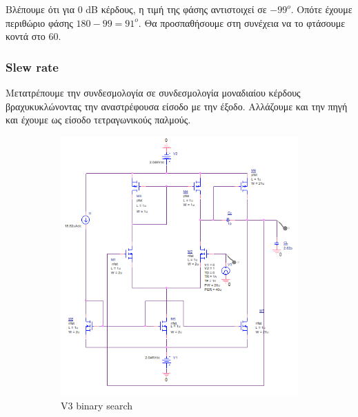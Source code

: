 \documentclass[12pt, a4paper]{article}
\begin{document}
Βλέπουμε ότι για 0 dB κέρδους, η τιμή της φάσης αντιστοιχεί σε $-99^o$. Οπότε έχουμε περιθώριο φάσης $180 - 99 = 91^ο$. Θα προσπαθήσουμε στη συνέχεια να το φτάσουμε κοντά στο 60. 

\pagebreak

\subsubsection{Slew rate}

Μετατρέπουμε την συνδεσμολογία σε συνδεσμολογία μοναδιαίου κέρδους βραχυκυκλώνοντας την αναστρέφουσα είσοδο με την έξοδο. Αλλάζουμε και την πηγή και έχουμε ως είσοδο τετραγωνικούς παλμούς.


\begin{figure}[h!]
     \begin{subfigure}[b]{0.5\textwidth}
         \centering
         \includegraphics[height=.4\textheight, width=\textwidth, keepaspectratio]{assets/slew_rate_circuit.png}
    \caption{V3 binary search}
     \end{subfigure}
     \begin{subfigure}[b]{0.5\textwidth}
         \centering

\end{subfigure}
\end{figure}
\end{document}
